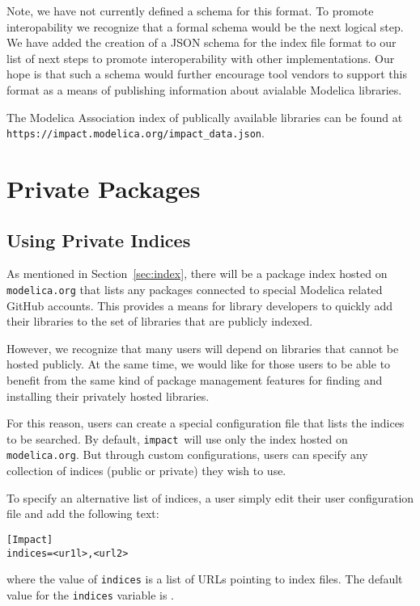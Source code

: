 \documentclass[11pt,a4paper,twocolumn]{article}
\newcommand{\impact}{\texttt{impact}} %
\newcommand{\code}[1]{\texttt{#1}} %
\begin{document}
Note, we have not currently defined a schema for this format.  To
promote interopability we recognize that a formal schema would be the
next logical step.  We have added the creation of a JSON schema for
the index file format to our list of next steps to promote
interoperability with other implementations.  Our hope is that such a
schema would further encourage tool vendors to support this format as
a means of publishing information about avialable Modelica libraries.

The Modelica Association index of publically available libraries can
be found at \code{https://impact.modelica.org/impact\_data.json}.

\section{Private Packages}
\label{sec:private}

\subsection{Using Private Indices}
\label{sec:use_private}

As mentioned in Section~\ref{sec:index}, there will be a package index
hosted on \code{modelica.org} that lists any packages connected to
special Modelica related GitHub accounts.  This provides a means for
library developers to quickly add their libraries to the set of
libraries that are publicly indexed.

However, we recognize that many users will depend on libraries that
cannot be hosted publicly.  At the same time, we would like for those
users to be able to benefit from the same kind of package management
features for finding and installing their privately hosted libraries.

For this reason, users can create a special configuration file that
lists the indices to be searched.  By default, \impact\ will use only
the index hosted on \code{modelica.org}.  But through custom
configurations, users can specify any collection of indices (public or
private) they wish to use.

To specify an alternative list of indices, a user simply edit their
user configuration file and add the following text:

\begin{verbatim}
[Impact]
indices=<ur1l>,<url2>
\end{verbatim}
where the value of \code{indices} is a list of URLs pointing to index
files.  The default value for the \code{indices} variable is \code{}.
\end{document}

